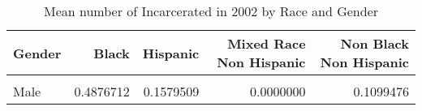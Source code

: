 \begin{table}[H]

\caption{\label{tab:tab:summarystats}Mean number of Incarcerated in 2002 by Race and Gender}
\centering
\begin{tabular}[t]{lrrrr}
\toprule
Gender & Black & Hispanic & Mixed Race Non Hispanic & Non Black Non Hispanic\\
\midrule
\cellcolor{gray!6}{Female} & \cellcolor{gray!6}{0.0211268} & \cellcolor{gray!6}{0.0298013} & \cellcolor{gray!6}{0.1428571} & \cellcolor{gray!6}{0.0193192}\\
Male & 0.4876712 & 0.1579509 & 0.0000000 & 0.1099476\\
\bottomrule
\end{tabular}
\end{table}
